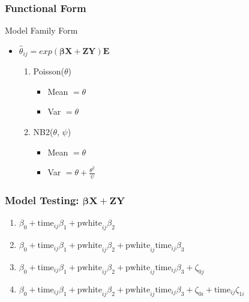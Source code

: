 \documentclass{beamer}
\begin{document}
\begin{frame}
\frametitle{Functional Form}
\begin{block}{Model Family Form}
  \begin{itemize}
    \item $\hat{\theta}_{ij} = exp(\boldsymbol{\beta}\mathbf{X} + \mathbf{ZY}) \mathbf{E}$
    \begin{enumerate}
      \item Poisson($\theta$)
      \begin{itemize}
        \item Mean $= \theta$
        \item Var $= \theta$
      \end{itemize}
      \item NB2($\theta$, $\psi$)
      \begin{itemize}
        \item Mean $= \theta$
        \item Var $= \theta + \frac{\theta^2}{\psi}$
      \end{itemize}
    \end{enumerate}
  \end{itemize}
\end{block}
\end{frame}


\begin{frame}
\frametitle{Model Testing: $\boldsymbol{\beta}\mathbf{X} + \mathbf{ZY}$}
\begin{enumerate}
  \item $\beta_0 + \text{time}_{ij} \beta_1  + \text{pwhite}_{ij} \beta_2$
  \item $\beta_0 + \text{time}_{ij} \beta_1  + \text{pwhite}_{ij} \beta_2 + \text{pwhite}_{ij}\text{time}_{ij} \beta_3$
  \item $\beta_0 + \text{time}_{ij} \beta_1  + \text{pwhite}_{ij} \beta_2 + \text{pwhite}_{ij}\text{time}_{ij} \beta_3 + \zeta_{0j}$
  \item $\beta_0 + \text{time}_{ij} \beta_1  + \text{pwhite}_{ij} \beta_2 + \text{pwhite}_{ij}\text{time}_{ij} \beta_3 + \zeta_{0i} + \text{time}_{ij} \zeta_{1i}$
\end{enumerate}
\end{frame}

\end{document}
